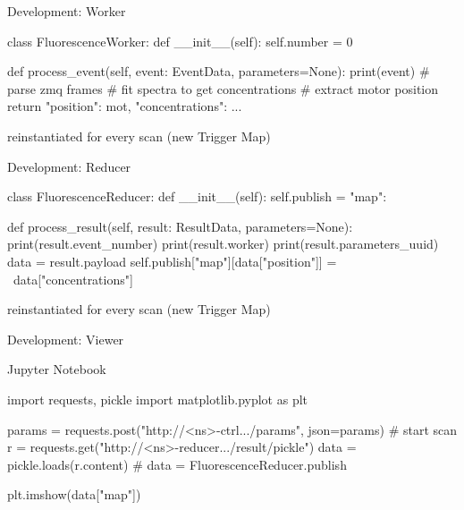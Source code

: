 \documentclass[aspectratio=169]{beamer}
\begin{document}
\begin{frame}[fragile]{Development: Worker}
  \begin{python}
class FluorescenceWorker:
    def __init__(self):
        self.number = 0

    def process_event(self, event: EventData,
                      parameters=None):
        print(event)
        # parse zmq frames
        # fit spectra to get concentrations
        # extract motor position
        return {"position": mot, "concentrations": ...}
\end{python}

reinstantiated for every scan (new Trigger Map)
\end{frame}

\begin{frame}[fragile]{Development: Reducer}
 \begin{python}
class FluorescenceReducer:
    def __init__(self):
        self.publish = {"map": {}}

    def process_result(self,
                      result: ResultData,
                      parameters=None):
        print(result.event_number)
        print(result.worker)
        print(result.parameters_uuid)
        data = result.payload
        self.publish["map"][data["position"]] = \
                data["concentrations"]
\end{python}

reinstantiated for every scan (new Trigger Map)

\end{frame}

\begin{frame}[fragile]{Development: Viewer}
 \begin{block}{Jupyter Notebook}
  \begin{python}
import requests, pickle
import matplotlib.pyplot as plt

params = {}
requests.post("http://<ns>-ctrl.../params", json=params)
# start scan
r = requests.get("http://<ns>-reducer.../result/pickle")
data = pickle.loads(r.content)
# data = FluorescenceReducer.publish

plt.imshow(data["map"])
  \end{python}

 \end{block}

\end{frame}
\end{document}
